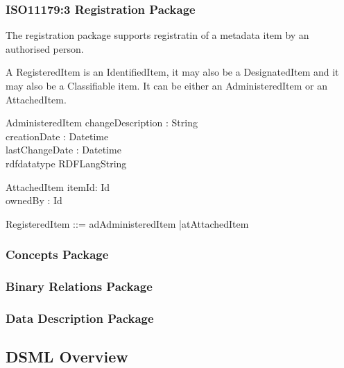 \documentclass{llncs}
\begin{document}
\subsubsection{ISO11179:3 Registration Package}

The registration package supports registratin of a metadata item by an authorised person. 

A RegisteredItem is an IdentifiedItem, it may also be a DesignatedItem and it may also be a Classifiable item. It can be either an AdministeredItem or an AttachedItem.


\begin{zed}
\end{zed}
\begin{schema}{AdministeredItem}
changeDescription : String \\
creationDate : Datetime \\
lastChangeDate : Datetime\\
\where
rdfdatatype \neq RDFLangString
\end{schema}

\begin{schema}{AttachedItem}
itemId: Id \\
ownedBy : Id
\end{schema}

\begin{zed}
RegisteredItem ::=  ad\ldata AdministeredItem \rdata |at\ldata AttachedItem \rdata
\end{zed}


\subsubsection{Concepts Package}



\subsubsection{Binary Relations Package}


\subsubsection{Data Description Package}




\subsection{DSML Overview}
\end{document}
